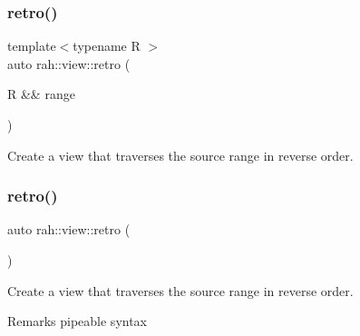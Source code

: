 \subsubsection{\texorpdfstring{retro()}{retro()}\hspace{0.1cm}{\footnotesize\ttfamily [1/2]}}
{\footnotesize\ttfamily template$<$typename R $>$ \\
auto rah\+::view\+::retro (\begin{DoxyParamCaption}\item[{R \&\&}]{range }\end{DoxyParamCaption})}



Create a view that traverses the source range in reverse order. 


\begin{DoxyCodeInclude}{0}
\end{DoxyCodeInclude}
\mbox{\label{namespacerah_1_1view_a6c6543c61f1fb119394952a72c564753}} 
\subsubsection{\texorpdfstring{retro()}{retro()}\hspace{0.1cm}{\footnotesize\ttfamily [2/2]}}
{\footnotesize\ttfamily auto rah\+::view\+::retro (\begin{DoxyParamCaption}{ }\end{DoxyParamCaption})\hspace{0.3cm}{\ttfamily [inline]}}



Create a view that traverses the source range in reverse order. 

\begin{DoxyRemark}{Remarks}
pipeable syntax
\end{DoxyRemark}


